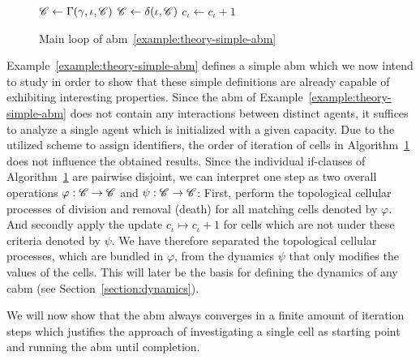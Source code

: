 \begin{figure}\centering
    \begin{minipage}{0.7\textwidth}
        \begin{algorithm}[H]
            \caption{Main loop of \ac{abm}~\ref{example:theory-simple-abm}}
            \label{algorithm:simple-abm-main-loop}
            \begin{algorithmic}[1]
                \State $\mathscr{C} \gets \Gamma(\gamma,\iota,\mathscr{C})$
                \State $\mathscr{C} \gets \delta(\iota, \mathscr{C})$
                \Else
                \State $c_\iota \gets c_\iota+1$
                \EndIf
                \EndFor
            \end{algorithmic}
        \end{algorithm}
    \end{minipage}
\end{figure}

Example~\ref{example:theory-simple-abm} defines a simple \ac{abm} which we now intend to study in
order to show that these simple definitions are already capable of exhibiting interesting
properties.
Since the \ac{abm} of Example~\ref{example:theory-simple-abm} does not contain any interactions
between distinct agents, it suffices to analyze a single agent which is initialized with a given
capacity.
Due to the utilized scheme to assign identifiers, the order of iteration of cells in
Algorithm~\ref{algorithm:simple-abm-main-loop} does not influence the obtained results.
Since the individual if-clauses of Algorithm~\ref{algorithm:simple-abm-main-loop} are pairwise
disjoint, we can interpret one step as two overall operations $\varphi:\mathscr{C}\rightarrow\mathscr{C}$ and
$\psi:\mathscr{C}\rightarrow\mathscr{C}$:
First, perform the topological cellular processes of division and removal (death) for all matching
cells denoted by $\varphi$.
And secondly apply the update $c_\iota\mapsto c_\iota+1$ for cells which are not under these
criteria denoted by $\psi$.
We have therefore separated the topological cellular processes, which are bundled in $\varphi$, from
the dynamics $\psi$ that only modifies the values of the cells.
This will later be the basis for defining the dynamics of any \ac{cabm} (see
Section~\ref{section:dynamics}).

We will now show that the \ac{abm} always converges in a finite amount of iteration steps which
justifies the approach of investigating a single cell as starting point and running the \ac{abm}
until completion.

